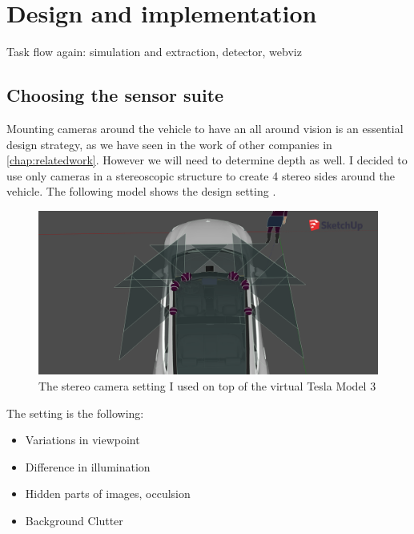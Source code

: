 \chapter{Design and implementation}
\label{chap:designimplementation}

Task flow again: simulation and extraction, detector, webviz


\section{Choosing the sensor suite}

Mounting cameras around the vehicle to have an all around vision is an essential
design strategy, as we have seen in the work of other companies in
\autoref{chap:relatedwork}. However we will need to determine depth as well. I
decided to use only cameras in a stereoscopic structure to create 4 stereo sides
around the vehicle. The following model shows the design setting .

\begin{figure}[!ht]
    \centering
    \includegraphics[width=150mm, keepaspectratio]{figures/3dmodel3.png}
    \caption{The stereo camera setting I used on top of the virtual Tesla Model 3}
    \label{fig:3dmodel3}
\end{figure}

The setting is the following: 
\begin{itemize}
    \item Variations in viewpoint
    \item Difference in illumination
    \item Hidden parts of images, occulsion
    \item Background Clutter
\end{itemize}

